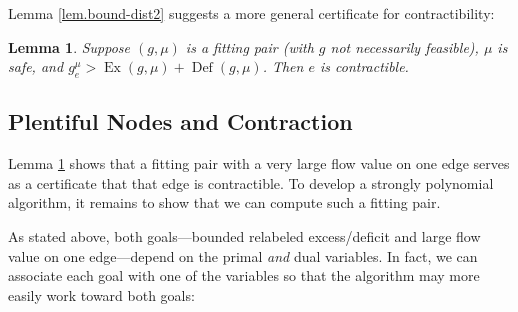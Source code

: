 \documentclass[11pt]{article}
\newtheorem{lemma}[theorem]{Lemma}
\theoremstyle{definition}
\theoremstyle{definition}
\theoremstyle{definition}
\DeclareMathOperator{\Ex}{Ex}
\DeclareMathOperator{\Def}{Def}
\begin{document}
    Lemma \ref{lem.bound-dist2} suggests a more general certificate for contractibility:
    \begin{lemma} \label{lem.contractibility}
    Suppose $(g, \mu)$ is a fitting pair (with $g$ not necessarily feasible),
    $\mu$ is safe, and $g^\mu_e > \Ex(g, \mu) + \Def(g, \mu)$.
    Then $e$ is contractible.
    \end{lemma}

%

	\subsection{Plentiful Nodes and Contraction}
    Lemma \ref{lem.contractibility} shows that a fitting pair with a very
    large flow value on one edge serves as a certificate that that edge is contractible.
    To develop a strongly polynomial algorithm, it remains to show that we can compute
    such a fitting pair.
    
    As stated above, both goals---bounded relabeled excess/deficit and
    large flow value on one edge---depend on the primal
    \emph{and} dual variables. In fact, we can associate each goal
    with one of the variables so that the algorithm may more easily work toward both goals:
    
\end{document}
